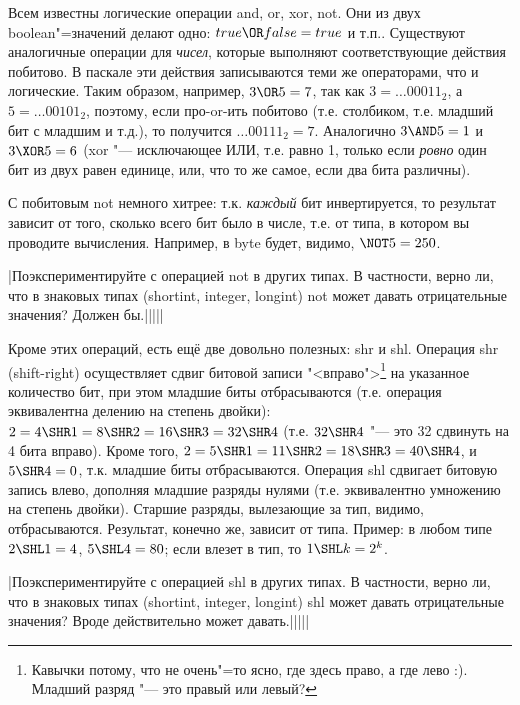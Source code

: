 
 Всем известны логические операции and, or, xor, not. Они из двух 
boolean"=значений делают одно: $true \OR false = true$ и т.п.. Существуют аналогичные операции
для \textit{чисел}, которые выполняют соответствующие действия побитово. В паскале эти действия
записываются теми же операторами, что и логические. Таким образом, например, $3 \OR 5= 7$, так как
$3=\dots00011_2$, а $5=\dots00101_2$, поэтому, если про-or-ить побитово (т.е. столбиком, т.е. 
младший бит с младшим и т.д.), то 
получится $\dots00111_2=7$. Аналогично $3 \AND 5 = 1$ и $3 \XOR 5 = 6$ (xor "--- исключающее ИЛИ, 
т.е. равно 1, только если \textit{ровно} один бит из двух равен единице, или, что то же самое, если 
два бита различны).

С побитовым not немного хитрее: т.к. \textit{каждый} бит инвертируется, то результат зависит от 
того, сколько всего бит было в числе, т.е. от типа, в котором вы проводите вычисления. Например, в 
byte будет, видимо, $\NOT 5= 250$.

\task|Поэкспериментируйте с операцией not в других типах. В частности, верно ли, что в 
знаковых типах (shortint, integer, longint) not может давать отрицательные значения? Должен бы.|||||

Кроме этих операций, есть ещё две довольно полезных: shr и shl. Операция shr (shift-right) осуществляет 
сдвиг битовой записи "<вправо">\footnote{Кавычки потому, что не очень"=то ясно, где здесь право, а 
где лево :). Младший разряд "--- это правый или левый?} на указанное количество бит, при этом 
младшие биты отбрасываются (т.е. операция эквивалентна  
делению на степень двойки): $2=4 \SHR 1=8 \SHR 2=16\SHR 3=32\SHR 4$ (т.е. $32 \SHR 4$ "--- это 32 
сдвинуть на 4 бита вправо). Кроме того, $2=5\SHR 1=11\SHR 2=18\SHR 3=40\SHR 4$, и $5\SHR 4=0$, т.к. младшие биты 
отбрасываются. Операция shl сдвигает битовую запись влево, дополняя младшие разряды нулями (т.е. 
эквивалентно умножению на степень двойки). Старшие 
разряды, вылезающие за тип, видимо, отбрасываются. Результат, конечно же, зависит от типа. Пример: 
в любом типе $2\SHL 1=4$, $5\SHL 4=80$; если влезет в тип, то $1\SHL k=2^k$.

\task|Поэкспериментируйте с операцией shl в других типах. В частности, верно ли, что в 
знаковых типах (shortint, integer, longint) shl может давать отрицательные значения? Вроде действительно может давать.|||||


